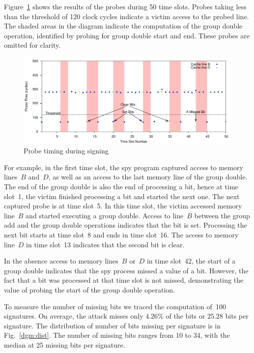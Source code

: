 \documentclass[twocolumn]{svjour3}
\begin{document}
Figure~\ref{dgm:timing} shows the results of the probes during 50 time slots.
Probes taking less than the threshold of 120 clock cycles indicate a victim access to the probed line.
The shaded areas in the diagram indicate the computation of the group double operation, identified
by probing for group double start and end.
These probes are omitted for clarity.


\begin{figure}[htb]
\centering\includegraphics[width=\textwidth]{images/timing}
\caption{Probe timing during signing\label{dgm:timing}}
\end{figure}

For example, in the first time slot, the spy program captured access to memory lines~$B$ and~$D$, as well as an access
to the last memory line of the group double.
The end of the group double is also the end of processing a bit, hence at time slot~1, the victim finished processing a bit
and started the next one.
The next captured probe is at time slot~5.
In this time slot, the victim accessed memory line~$B$ and started executing a group double.  
Access to line~$B$ between the group add and the group double operations indicates that the bit is set.
Processing the next bit starts at time slot~8 and ends in time slot~16.
The access to memory line~$D$ in time slot~13 indicates that the second bit is clear.

In the absence access to memory lines~$B$ or~$D$ in time slot~42, the start of a group double indicates
that the spy process missed a value of a bit.
However, the fact that a bit was processed at that time slot is not missed,
demonstrating the value of probing the start of the group double operation.

To measure the number of missing bits we traced the computation of~100 signatures.
On average, the attack misses only $4.26\%$ of the bits or $25.28$ bits per signature.
The distribution of number of bits missing per signature is in Fig.~\ref{dgm:dist}.
The number of missing bits ranges from 10 to 34, with the median at 25 missing bits per signature.
\end{document}
